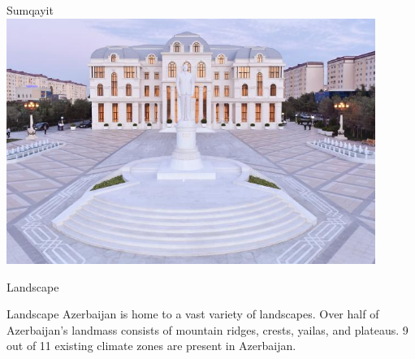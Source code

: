 \documentclass[hyperref={pdfpagemode=FullScreen}]{beamer}
\begin{document}
\begin{frame}{Sumqayit}
\includegraphics[width=12cm, height=8cm]{img/sum03.jpg}
\end{frame}

\begin{frame}{Landscape}
\begin{alertblock}{Landscape}
Azerbaijan is home to a vast variety of landscapes.
Over half of Azerbaijan's landmass consists of mountain ridges, crests, yailas, and plateaus.
9 out of 11 existing climate zones are present in
Azerbaijan.
\end{alertblock}
\end{frame}
\end{document}
